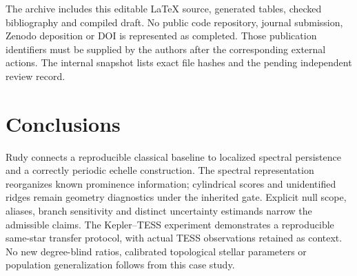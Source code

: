 \documentclass[11pt]{article}
\begin{document}
The archive includes this editable LaTeX source, generated tables, checked
bibliography and compiled draft. No public code repository, journal submission,
Zenodo deposition or DOI is represented as completed. Those publication identifiers
must be supplied by the authors after the corresponding external actions.
The internal snapshot lists exact file hashes and the pending independent
review record.

\section{Conclusions}
Rudy connects a reproducible classical baseline to localized spectral persistence
and a correctly periodic echelle construction. The spectral representation
reorganizes known prominence information; cylindrical scores and unidentified
ridges remain geometry diagnostics under the inherited gate. Explicit null
scope, aliases, branch sensitivity and distinct uncertainty estimands narrow
the admissible claims. The Kepler--TESS experiment demonstrates a reproducible
same-star transfer protocol, with actual TESS observations retained as context.
No new degree-blind ratios, calibrated topological stellar parameters or
population generalization follows from this case study.

\clearpage
\appendix
\end{document}
